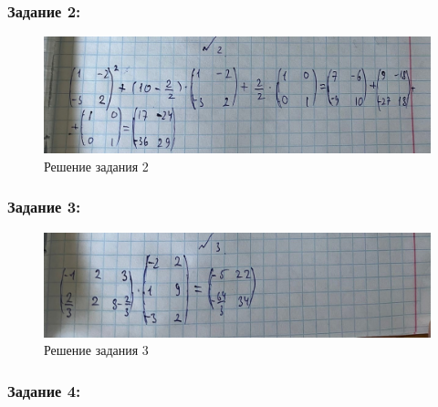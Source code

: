 \documentclass[spec, och, labwork]{shiza}
\begin{document}
\subsubsection{Задание 2:}

\begin{figure}[H]
    \centering      %
    \includegraphics[width=1.\textwidth]{15}
    \caption{Решение задания 2}
    \label{fig:image1}
\end{figure}

\subsubsection{Задание 3:}

\begin{figure}[H]
    \centering      %
    \includegraphics[width=1.\textwidth]{16}
    \caption{Решение задания 3}
    \label{fig:image1}
\end{figure}

\subsubsection{Задание 4:}
\end{document}
